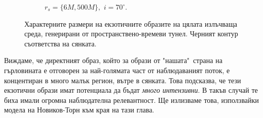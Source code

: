 \begin{figure}[!htb]
\begin{subfigure}{6cm}
		\caption{$r_s = \{6M, 500M\},\,\, i = 70^\circ$.}
	\end{subfigure}
	\caption[Характерните размери на екзотичните образите на цялата излъчваща среда, генерирани от пространствено-времеви тунел.]{\small Характерните размери на екзотичните образите на цялата излъчваща среда, генерирани от пространствено-времеви тунел. Черният контур съответства на сянката.} 
	\label{WH_img_size_deg}
\end{figure}
Виждаме, че директният образ, който за образи от "нашата"$\,$ страна на гърловината е отговорен за най-голямата част от наблюдаваният поток, е концентиран в много малък регион, вътре в сянката. Това подсказва, че тези екзотични образи имат потенциала да бъдат \emph{много интензивни}. В такъв случай те биха имали огромна наблюдателна релевантност. Ще излизваме това, използвайки модела на Новиков-Торн към края на тази глава.\\ 

